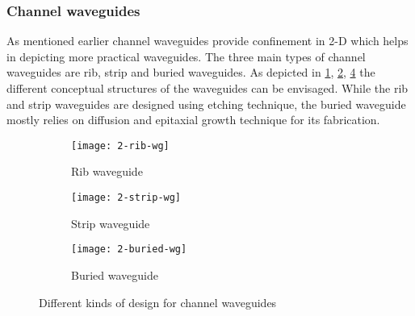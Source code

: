 \documentclass[../report.tex]{subfiles}
\begin{document}
			\subsubsection{Channel waveguides}			
As mentioned earlier channel waveguides provide confinement in 2-D which helps in depicting more practical waveguides. The three main types of channel waveguides are rib, strip and buried waveguides. As depicted in \ref{fig:2_rib_wg}, \ref{fig:2_strip_wg}, \ref{fig:2_buried_wg} the different conceptual structures of the waveguides can be envisaged. While the rib and strip waveguides are designed using etching technique, the buried waveguide mostly relies on diffusion and epitaxial growth technique for its fabrication.
\begin{figure}[H] %
	\begin{subfigure}[t]{0.3\textwidth}
		\texttt{[image: 2-rib-wg]}
		\caption{Rib waveguide}
		\label{fig:2_rib_wg}
	\end{subfigure}
	\hfill
	\begin{subfigure}[t]{0.3\textwidth}
		\texttt{[image: 2-strip-wg]}
		\caption{Strip waveguide}
		\label{fig:2_strip_wg}
	\end{subfigure}
	\hfill
	\begin{subfigure}[t]{0.3\textwidth}
		\texttt{[image: 2-buried-wg]}
		\caption{Buried waveguide}
		\label{fig:2_buried_wg}
	\end{subfigure}
	\caption{Different kinds of design for channel waveguides}
\end{figure}
\end{document}
